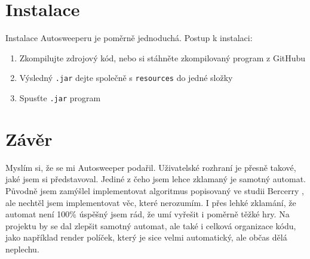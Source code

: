 
\section{Instalace}
Instalace Autosweeperu je poměrně jednoduchá. Postup k instalaci:
\begin{enumerate}
    \item Zkompilujte zdrojový kód, nebo si stáhněte zkompilovaný program z GitHubu
    \item Výsledný {\tt .jar} dejte společně s {\tt resources} do jedné složky
    \item Spusťte {\tt .jar} program
\end{enumerate}

\section{Závěr}
Myslím si, že se mi Autosweeper podařil. Uživatelské rozhraní je přesně takové, jaké jsem si představoval. Jediné z čeho jsem lehce
zklamaný je samotný automat. Původně jsem zamýšlel implementovat algoritmus popisovaný ve studii Bercerry \cite{bercerra2015}, ale
nechtěl jsem implementovat věc, které nerozumím. I přes lehké zklamání, že automat není 100\% úspěšný jsem rád, že umí vyřešit i
poměrně těžké hry. Na projektu by se dal zlepšit samotný automat, ale také i celková organizace kódu, jako například render políček,
který je sice velmi automatický, ale občas dělá neplechu.